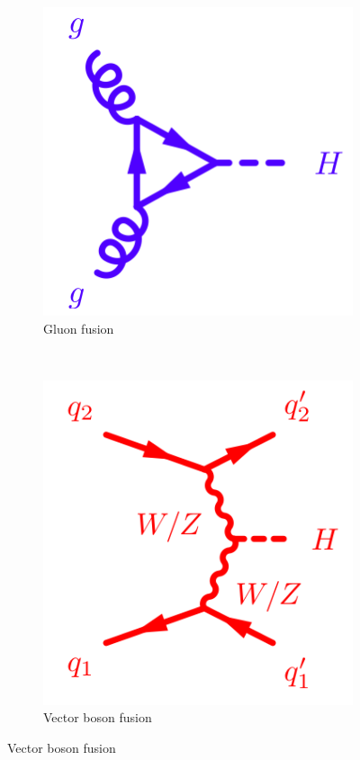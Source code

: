 \begin{figure}
        \centering
        \begin{subfigure}[b]{0.3\textwidth}
                \includegraphics[width=\textwidth]{1_Introduction_Th_and_Exp/pics/ggFusion.png}
                \caption{Gluon fusion}
                \label{fig:ggf}
        \end{subfigure}%
        ~ 
        \begin{subfigure}[b]{0.3\textwidth}
                \includegraphics[width=\textwidth]{1_Introduction_Th_and_Exp/pics/BosonFusion.png}
                \caption{Vector boson fusion}
                \label{fig:vbf}
        \end{subfigure}


\end{figure}
